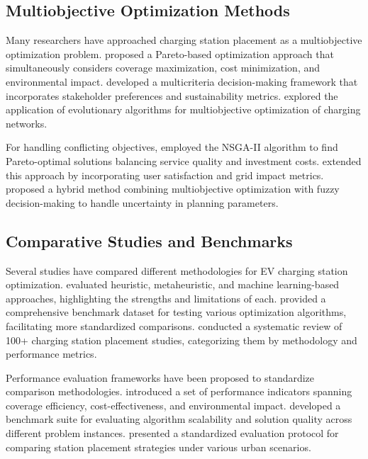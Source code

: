 \documentclass[journal]{IEEEtran}
\begin{document}
\subsection{Multiobjective Optimization Methods}
Many researchers have approached charging station placement as a multiobjective optimization problem. \cite{islam2018multiobjective} proposed a Pareto-based optimization approach that simultaneously considers coverage maximization, cost minimization, and environmental impact. \cite{awasthi2017multicriteria} developed a multicriteria decision-making framework that incorporates stakeholder preferences and sustainability metrics. \cite{raposo2019biinspired} explored the application of evolutionary algorithms for multiobjective optimization of charging networks.

For handling conflicting objectives, \cite{tan2019multiobjective} employed the NSGA-II algorithm to find Pareto-optimal solutions balancing service quality and investment costs. \cite{lopez2019multiobjective} extended this approach by incorporating user satisfaction and grid impact metrics. \cite{bagloee2017hybrid} proposed a hybrid method combining multiobjective optimization with fuzzy decision-making to handle uncertainty in planning parameters.

\subsection{Comparative Studies and Benchmarks}
Several studies have compared different methodologies for EV charging station optimization. \cite{yang2020comparison} evaluated heuristic, metaheuristic, and machine learning-based approaches, highlighting the strengths and limitations of each. \cite{zhang2021benchmark} provided a comprehensive benchmark dataset for testing various optimization algorithms, facilitating more standardized comparisons. \cite{meng2018comprehensive} conducted a systematic review of 100+ charging station placement studies, categorizing them by methodology and performance metrics.

Performance evaluation frameworks have been proposed to standardize comparison methodologies. \cite{dong2019comparative} introduced a set of performance indicators spanning coverage efficiency, cost-effectiveness, and environmental impact. \cite{khan2018performance} developed a benchmark suite for evaluating algorithm scalability and solution quality across different problem instances. \cite{lin2020standardized} presented a standardized evaluation protocol for comparing station placement strategies under various urban scenarios.
\end{document}
